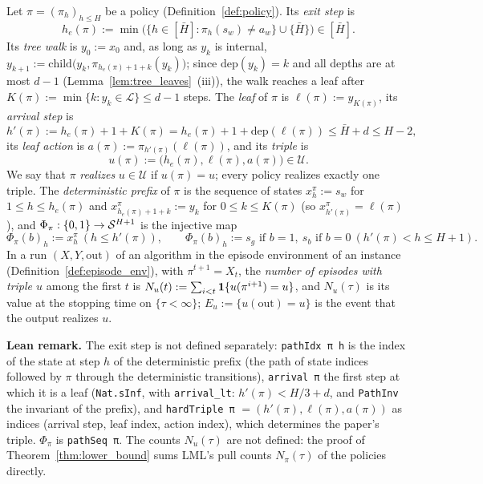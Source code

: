 \begin{definition}\label{def:hard_triple}
\leanok
Let $\pi = (\pi_h)_{h \le H}$ be a policy (Definition~\ref{def:policy}). Its \emph{exit step} is
\[
  h_e(\pi) := \min\big(\{h \in [\bar H] : \pi_h(s_w) \ne a_w\} \cup \{\bar H\}\big) \in [\bar H] .
\]
Its \emph{tree walk} is $y_0 := x_0$ and, as long as $y_k$ is internal,
$y_{k+1} := \mathrm{child}\big(y_k, \pi_{h_e(\pi) + 1 + k}(y_k)\big)$; since
$\mathrm{dep}(y_k) = k$ and all depths are at most $d - 1$ (Lemma~\ref{lem:tree_leaves}~(iii)),
the walk reaches a leaf after $K(\pi) := \min\{k : y_k \in \mathcal L\} \le d - 1$ steps. The
\emph{leaf} of $\pi$ is $\ell(\pi) := y_{K(\pi)}$, its \emph{arrival step} is
\[
  h'(\pi) := h_e(\pi) + 1 + K(\pi) = h_e(\pi) + 1 + \mathrm{dep}(\ell(\pi)) \le \bar H + d \le H - 2,
\]
its \emph{leaf action} is $a(\pi) := \pi_{h'(\pi)}(\ell(\pi))$, and its \emph{triple} is
\[
  u(\pi) := \big(h_e(\pi), \ell(\pi), a(\pi)\big) \in \mathcal U .
\]
We say that $\pi$ \emph{realizes} $u \in \mathcal U$ if $u(\pi) = u$; every policy realizes
exactly one triple. The \emph{deterministic prefix} of $\pi$ is the sequence of states
$x^\pi_h := s_w$ for $1 \le h \le h_e(\pi)$ and $x^\pi_{h_e(\pi) + 1 + k} := y_k$ for
$0 \le k \le K(\pi)$ (so $x^\pi_{h'(\pi)} = \ell(\pi)$), and
$\Phi_\pi : \{0, 1\} \to \mathcal{S}^{H+1}$ is the injective map
\[
  \Phi_\pi(b)_h := x^\pi_h \ (h \le h'(\pi)), \qquad \Phi_\pi(b)_h := s_g \text{ if } b = 1,\ s_b \text{ if } b = 0 \ (h'(\pi) < h \le H + 1).
\]
In a run $(X, Y, \mathrm{out})$ of an algorithm in the episode environment of an instance
(Definition~\ref{def:episode_env}), with $\pi^{t+1} = X_t$, the \emph{number of episodes with
triple $u$} among the first $t$ is $N_u(t) := \sum_{i < t}\mathbf{1}\{u(\pi^{i+1}) = u\}$, and
$N_u(\tau)$ is its value at the stopping time on $\{\tau < \infty\}$; $E_u := \{u(\mathrm{out}) = u\}$
is the event that the output realizes $u$.
\end{definition}

\textbf{Lean remark.} The exit step is not defined separately: \texttt{pathIdx π h} is the index of the
state at step $h$ of the deterministic prefix (the path of state indices followed by $\pi$ through the
deterministic transitions), \texttt{arrival π} the first step at which it is a leaf
(\texttt{Nat.sInf}, with \texttt{arrival\_lt}: $h'(\pi) < H/3 + d$, and \texttt{PathInv} the invariant of
the prefix), and \texttt{hardTriple π} $= (h'(\pi), \ell(\pi), a(\pi))$ as indices (arrival step, leaf
index, action index), which determines the paper's triple. $\Phi_\pi$ is \texttt{pathSeq π}. The counts
$N_u(\tau)$ are not defined: the proof of Theorem~\ref{thm:lower_bound} sums LML's pull counts
$N_\pi(\tau)$ of the policies directly.

